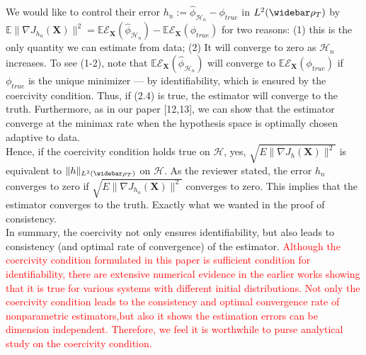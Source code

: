 \documentclass[12pt]{article}
\newcommand{\wbar}\widebar
\newcommand{\mbf}[1]{\boldsymbol{#1}}
\newcommand{\bX}{\mbf{X}}
\newcommand{\hypspace}{\mathcal{H}}
\newcommand{\E}{\mathbb{E}}
\begin{document}
\begin{enumerate}
{We would like to control their error $h_n:= \widehat\phi_{\hypspace_n} - \phi_{true}$ in $L^2(\wbar \rho_T)$ by $ \E\|\nabla J_{h_n}(\bX)\|^2 = \E \mathcal{E}_{\bX}(\widehat\phi_{\hypspace_n}) -  \E\mathcal{E}_{\bX}(\phi_{true})$ for two reasons: (1) this is the only quantity we can estimate from data; (2) It will converge to zero as $\hypspace_n$ increases. To see (1-2), note that $\E \mathcal{E}_{\bX}(\widehat\phi_{\hypspace_n})$ will converge to  $\E\mathcal{E}_{\bX}(\phi_{true})$ if $\phi_{true}$ is the unique minimizer --- by identifiability, which is ensured by the coercivity condition. Thus, if (2.4) is true, the estimator will converge to the truth. Furthermore, as in our paper [12,13], we can show that the estimator converge at the minimax rate when the hypothesis space is optimally chosen adaptive to data. 
 \\
Hence, if the coercivity condition holds true on $\hypspace$, yes, $\sqrt{E\|\nabla J_{h}(\bX)\|^2}$ is equivalent to $\|h\|_{L^2(\wbar \rho_T)}$ on $\hypspace$. As the reviewer stated, the error $h_n$ converges to zero if $\sqrt{E\|\nabla J_{h_n}(\bX)\|^2}$ converges to zero. This implies that the estimator converges to the truth. Exactly what we wanted in the proof of consistency.  \\
In summary, the coercivity not only ensures identifiability, but also leads to consistency (and optimal rate of convergence) of the estimator. \textcolor{red}{Although the coercivity condition formulated in this paper is sufficient condition for identifiability, there are extensive numerical evidence in the earlier works showing that it is true for various systems with different initial distributions. Not only the coercivity condition leads to the consistency and optimal convergence rate of nonparametric estimators,but also it shows the estimation errors can be dimension independent. Therefore, we feel it is worthwhile to purse analytical study on the coercivity condition. }
} 
\end{enumerate}
\end{document}
